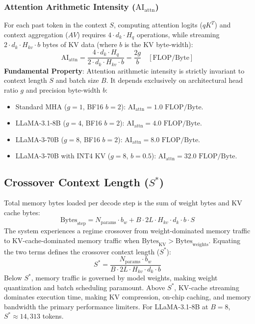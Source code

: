 \documentclass[conference,onecolumn]{IEEEtran}
\begin{document}
\subsubsection{Attention Arithmetic Intensity ($\text{AI}_{\text{attn}}$)}
For each past token in the context $S$, computing attention logits ($qK^T$) and context aggregation ($AV$) requires $4 \cdot d_k \cdot H_q$ operations, while streaming $2 \cdot d_k \cdot H_{kv} \cdot b$ bytes of KV data (where $b$ is the KV byte-width):
\begin{equation}
\text{AI}_{\text{attn}} = \frac{4 \cdot d_k \cdot H_q}{2 \cdot d_k \cdot H_{kv} \cdot b} = \frac{2g}{b} \quad [\text{FLOP/Byte}]
\end{equation}
\textbf{Fundamental Property}: Attention arithmetic intensity is strictly invariant to context length $S$ and batch size $B$. It depends exclusively on architectural head ratio $g$ and precision byte-width $b$:
\begin{itemize}
    \item Standard MHA ($g = 1$, BF16 $b = 2$): $\text{AI}_{\text{attn}} = 1.0\text{ FLOP/Byte}$.
    \item LLaMA-3.1-8B ($g = 4$, BF16 $b = 2$): $\text{AI}_{\text{attn}} = 4.0\text{ FLOP/Byte}$.
    \item LLaMA-3-70B ($g = 8$, BF16 $b = 2$): $\text{AI}_{\text{attn}} = 8.0\text{ FLOP/Byte}$.
    \item LLaMA-3-70B with INT4 KV ($g = 8$, $b = 0.5$): $\text{AI}_{\text{attn}} = 32.0\text{ FLOP/Byte}$.
\end{itemize}

\subsection{Crossover Context Length ($S^*$)}
Total memory bytes loaded per decode step is the sum of weight bytes and KV cache bytes:
\begin{equation}
\text{Bytes}_{\text{step}} = N_{\text{params}} \cdot b_w + B \cdot 2L \cdot H_{kv} \cdot d_k \cdot b \cdot S
\end{equation}
The system experiences a regime crossover from weight-dominated memory traffic to KV-cache-dominated memory traffic when $\text{Bytes}_{\text{KV}} > \text{Bytes}_{\text{weights}}$. Equating the two terms defines the crossover context length ($S^*$):
\begin{equation}
S^* = \frac{N_{\text{params}} \cdot b_w}{B \cdot 2L \cdot H_{kv} \cdot d_k \cdot b}
\end{equation}
Below $S^*$, memory traffic is governed by model weights, making weight quantization and batch scheduling paramount. Above $S^*$, KV-cache streaming dominates execution time, making KV compression, on-chip caching, and memory bandwidth the primary performance limiters. For LLaMA-3.1-8B at $B=8$, $S^* \approx 14,313$ tokens.
\end{document}
